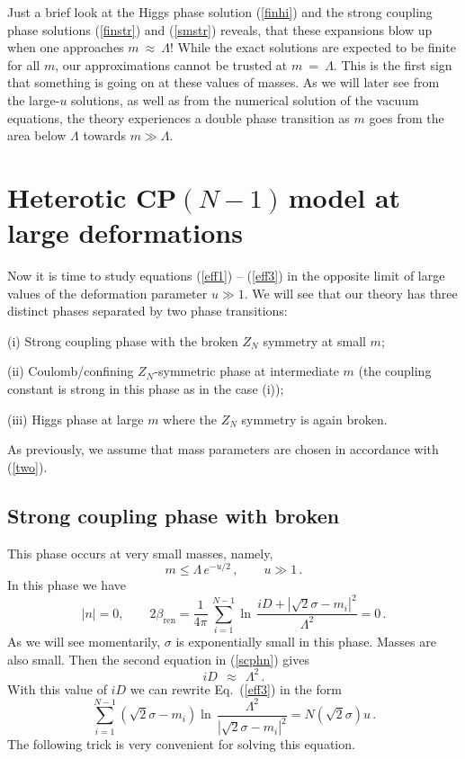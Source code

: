 \documentclass[epsfig,12pt]{article}
\def\beq{\begin{equation}}
\def\eeq{\end{equation}}
\newcommand{\cpn}{CP$(N-1)\,$}
\def\beq{\begin{equation}}
\def\eeq{\end{equation}}
\newcommand{\bren}{{\beta_\text{ren}}}
\begin{document}
{	Just a brief look at the Higgs phase solution (\ref{finhi}) and the strong coupling phase solutions
	(\ref{finstr}) and (\ref{smstr}) reveals, that these expansions blow up 
	when one approaches $ m ~\approx~ \Lambda $! 
	While the exact solutions are expected to be finite for all $m$, our approximations cannot be trusted
	at $ m ~=~ \Lambda $.
	This is the first sign that something is going on at these values of masses.
	As we will later see from the large-$u$ solutions, as well as from the numerical solution of the 
	vacuum equations, the theory experiences a double phase transition as $m$ goes from the area
	below $ \Lambda $ towards $ m \gg \Lambda $.


\section{ Heterotic \cpn model at large  deformations}
\label{hetdefld}
\setcounter{equation}{0}

Now it is time to study equations (\ref{eff1}) -- (\ref{eff3}) in the opposite limit of large values of 
the deformation parameter $u\gg 1$. We will see that our theory has three distinct phases 
separated by two phase transitions:

\vspace{1mm}

 (i) Strong coupling phase  with the broken $Z_N$
symmetry at small $m$;

(ii)  Coulomb/confining $Z_N$-symmetric
phase at intermediate $m$ (the coupling constant is strong in this phase as in the case (i)); 

(iii) Higgs phase
at large $m$ where the $Z_N$ symmetry is again broken.

\vspace{1mm}

As previously,  we assume that mass parameters are chosen in accordance with
(\ref{two}).

\subsection{ Strong coupling phase with broken }
\label{scpwbz}

This phase occurs at very small masses, namely,
\beq
m\le \Lambda\,e^{-u/2}\,,\qquad u\gg 1\,.
\label{scphmass}
\eeq
In this phase we have 
\beq
|n|=0,\qquad 2\bren=\frac{1}{4\pi}\, 
\sum_{i=1}^{N-1}\ln\, {\frac{iD +|\sqrt{2}\sigma-m_i|^2}{\Lambda^2}} =0\, .
\label{scphn}
\eeq
As we will see momentarily,  $\sigma$ is exponentially small in this phase. Masses are also
small. 
Then the second equation in (\ref{scphn}) gives
\beq
iD ~~\approx~~ \Lambda^2 \,.
\label{scphD}
\eeq
With this value of $iD$ we can rewrite Eq.~(\ref{eff3}) in the form
\beq
 \sum_{i=1}^{N-1}\left(\sqrt{2}\sigma-m_i\right)\ln\, {\frac{\Lambda^2}{\left|\sqrt{2}\sigma-m_i\right|^2}}
=N\left(\sqrt{2}\sigma\right)u\,.
\label{scpheq3}
\eeq
The following trick is very convenient for solving this equation.

}
\end{document}
